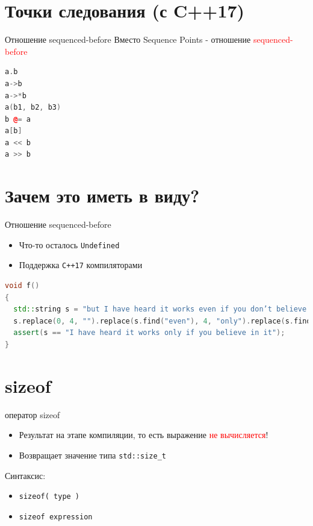 \documentclass[10pt]{beamer}
\begin{document}
\section{Точки следования (с C++17)}
\begin{frame}[fragile]{Отношение sequenced-before}
Вместо Sequence Points - отношение \textcolor{red}{sequenced-before}
\begin{lstlisting}[language=C++]
a.b
a->b
a->*b
a(b1, b2, b3)
b @= a
a[b]
a << b
a >> b
\end{lstlisting}
\end{frame}

\section{Зачем это иметь в виду?}
\begin{frame}[fragile]{Отношение sequenced-before}
\begin{itemize}
\item{Что-то осталось \texttt{Undefined}}
\item{Поддержка \texttt{C++17} компиляторами}
\end{itemize}
\pause
\begin{lstlisting}[language=C++]
void f()
{
  std::string s = "but I have heard it works even if you don’t believe in it";
  s.replace(0, 4, "").replace(s.find("even"), 4, "only").replace(s.find(" don't"), 6, "");
  assert(s == "I have heard it works only if you believe in it");
}
\end{lstlisting}
\end{frame}

\section{sizeof}
\begin{frame}[fragile]{оператор sizeof}
\begin{itemize}
\item{Результат на этапе компиляции, то есть выражение \textcolor{red}{не вычисляется}!}
\item{Возвращает значение типа \texttt{std::size\_t}}
\end{itemize}
Синтаксис:
\begin{itemize}
\item{\texttt{sizeof( type )}}
\item{\texttt{sizeof expression}}
\end{itemize}
\end{frame}
\end{document}
